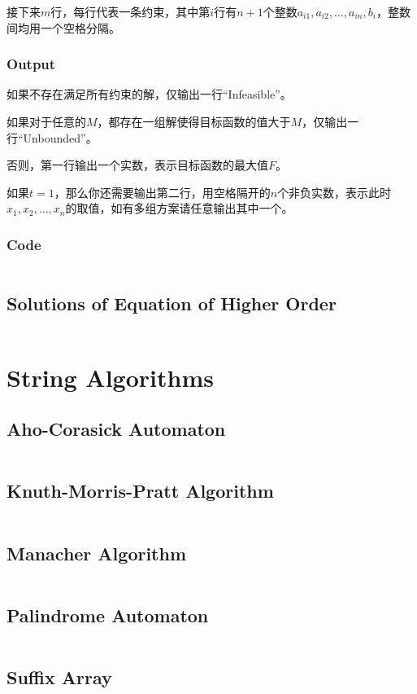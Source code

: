 \documentclass[a4paper,openany]{book}
\newcommand{\cppcode}[1]
{
  \inputminted[mathescape,
  tabsize=4,
  linenos,
  framesep=2mm,
  breakaftergroup=true,
  breakautoindent=true,
  breakbytoken=true,
  breaklines=true,
  fontsize=\small
  ]{cpp}{source/#1}
}
\begin{document}
接下来$m$行，每行代表一条约束，其中第$i$行有$n+1$个整数$a_{i1},a_{i2},\ldots,a_{in},b_i$，整数间均用一个空格分隔。
\subsection{Output}
如果不存在满足所有约束的解，仅输出一行``Infeasible''。

如果对于任意的$M$，都存在一组解使得目标函数的值大于$M$，仅输出一行``Unbounded''。

否则，第一行输出一个实数，表示目标函数的最大值$F$。

如果$t=1$，那么你还需要输出第二行，用空格隔开的$n$个非负实数，表示此时$x_1,x_2,\ldots,x_n$的取值，如有多组方案请任意输出其中一个。
\subsection{Code}
\cppcode{/Numerical Algorithms/Simplex.cpp}
\section{Solutions of Equation of Higher Order}
\cppcode{/Numerical Algorithms/Solutions of Equation of Higher Order.cpp}

\chapter{String Algorithms}
\section{Aho-Corasick Automaton}
\cppcode{/String Algorithms/Aho-Corasick Automaton.cpp}
\section{Knuth-Morris-Pratt Algorithm}
\cppcode{/String Algorithms/Knuth-Morris-Pratt Algorithm.cpp}
\section{Manacher Algorithm}
\cppcode{/String Algorithms/Manacher Algorithm.cpp}
\section{Palindrome Automaton}
\cppcode{/String Algorithms/Palindrome Automaton.cpp}
\section{Suffix Array}
\cppcode{/String Algorithms/Suffix Array.cpp}
\end{document}
